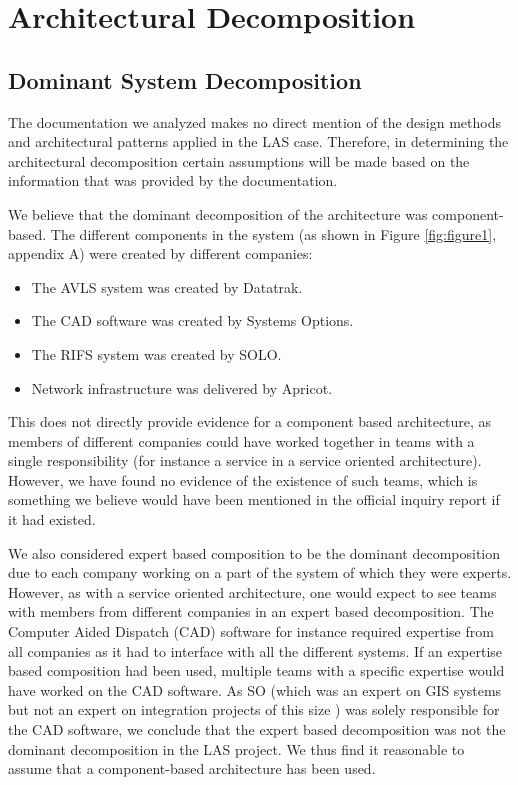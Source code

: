\section*{Architectural Decomposition}

\subsection*{Dominant System Decomposition}

The documentation we analyzed makes no direct mention of the design methods and architectural patterns applied in the LAS case.
Therefore, in determining the architectural decomposition certain assumptions will be made based on the information that was provided by the documentation.

We believe that the dominant decomposition of the architecture was component-based.
The different components in the system (as shown in Figure \ref{fig:figure1}, appendix A) were created by different companies:
\begin{itemize}[noitemsep]
\item The AVLS system was created by Datatrak.
\item The CAD software was created by Systems Options.
\item The RIFS system was created by SOLO.
\item Network infrastructure was delivered by Apricot.
\end{itemize}

This does not directly provide evidence for a component based architecture, as members of different companies could have worked together in teams with a single responsibility
(for instance a service in a service oriented architecture).
However, we have found no evidence of the existence of such teams, which is something we believe would have been mentioned in the official inquiry report \autocite{officialreport} if it had existed.

We also considered expert based composition to be the dominant decomposition due to each company working on a part of the system of which they were experts.
However, as with a service oriented architecture, one would expect to see teams with members from different companies in an expert based decomposition.
The Computer Aided Dispatch (CAD) software for instance required expertise from all companies as it had to interface with all the different systems.
If an expertise based composition had been used, multiple teams with a specific expertise would have worked on the CAD software.
As SO (which was an expert on GIS systems \autocite{techsum} but not an expert on integration projects of this size \autocite[3078]{officialreport}) was solely responsible for the CAD software,
we conclude that the expert based decomposition was not the dominant decomposition in the LAS project.
We thus find it reasonable to assume that a component-based architecture has been used.

